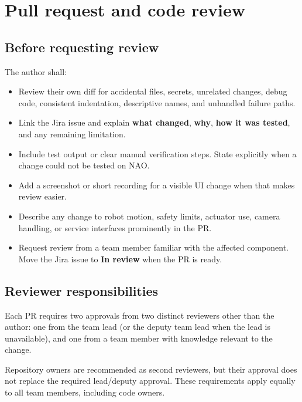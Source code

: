 \documentclass[12pt,a4paper]{article}
\begin{document}
\section{Pull request and code review}

\subsection{Before requesting review}

The author shall:

\begin{itemize}

\item Review their own diff for accidental files, secrets, unrelated changes, debug code, consistent indentation, descriptive names, and unhandled failure paths.

\item Link the Jira issue and explain \textbf{what changed}, \textbf{why}, \textbf{how it was tested}, and any remaining limitation.

\item Include test output or clear manual verification steps. State explicitly when a change could not be tested on NAO.

\item Add a screenshot or short recording for a visible UI change when that makes review easier.

\item Describe any change to robot motion, safety limits, actuator use, camera handling, or service interfaces prominently in the PR.

\item Request review from a team member familiar with the affected component. Move the Jira issue to \textbf{In review} when the PR is ready.

\end{itemize}

\subsection{Reviewer responsibilities}

Each PR requires two approvals from two distinct reviewers other
than the author: one from the team lead (or the deputy team lead
when the lead is unavailable), and one from a team member with
knowledge relevant to the change.

Repository owners are recommended as second reviewers, but their
approval does not replace the required lead/deputy approval.
These requirements apply equally to all team members,
including code owners.
\end{document}
